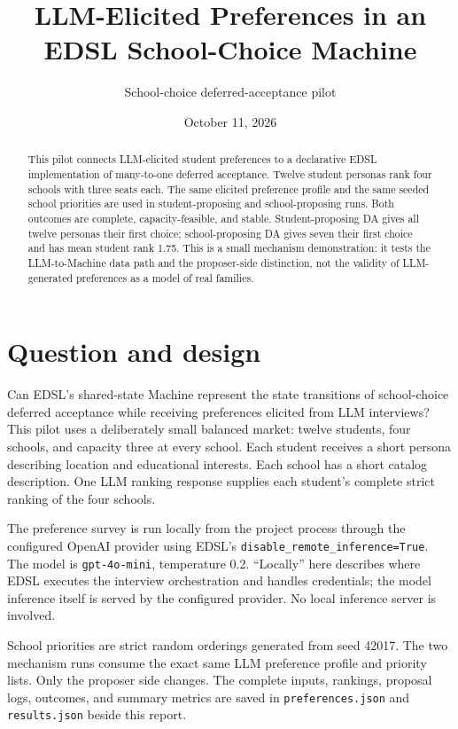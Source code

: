 \documentclass[11pt]{article}
\title{LLM-Elicited Preferences in an EDSL School-Choice Machine}
\author{School-choice deferred-acceptance pilot}
\date{October 11, 2026}
\begin{document}
\maketitle

\begin{abstract}
This pilot connects LLM-elicited student preferences to a declarative EDSL implementation of many-to-one deferred acceptance. Twelve student personas rank four schools with three seats each. The same elicited preference profile and the same seeded school priorities are used in student-proposing and school-proposing runs. Both outcomes are complete, capacity-feasible, and stable. Student-proposing DA gives all twelve personas their first choice; school-proposing DA gives seven their first choice and has mean student rank 1.75. This is a small mechanism demonstration: it tests the LLM-to-Machine data path and the proposer-side distinction, not the validity of LLM-generated preferences as a model of real families.
\end{abstract}

\section{Question and design}
Can EDSL's shared-state Machine represent the state transitions of school-choice deferred acceptance while receiving preferences elicited from LLM interviews? This pilot uses a deliberately small balanced market: twelve students, four schools, and capacity three at every school. Each student receives a short persona describing location and educational interests. Each school has a short catalog description. One LLM ranking response supplies each student's complete strict ranking of the four schools.

The preference survey is run locally from the project process through the configured OpenAI provider using EDSL's \texttt{disable\_remote\_inference=True}. The model is \texttt{gpt-4o-mini}, temperature 0.2. “Locally” here describes where EDSL executes the interview orchestration and handles credentials; the model inference itself is served by the configured provider. No local inference server is involved.

School priorities are strict random orderings generated from seed 42017. The two mechanism runs consume the exact same LLM preference profile and priority lists. Only the proposer side changes. The complete inputs, rankings, proposal logs, outcomes, and summary metrics are saved in \texttt{preferences.json} and \texttt{results.json} beside this report.
\end{document}
